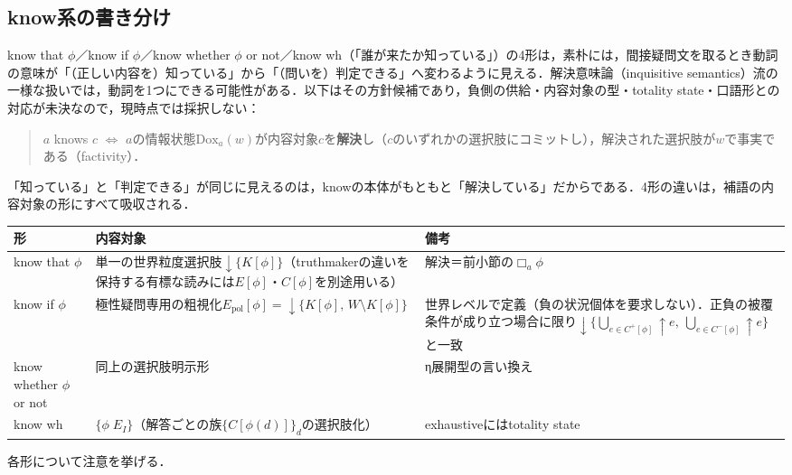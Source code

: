 \documentclass[../../main-detail.tex]{subfiles}
\begin{document}
\subsection{know系の書き分け}\label{subsec:know-forms}
know that $\phi$／know if $\phi$／know whether $\phi$ or not／know wh（「誰が来たか知っている」）の4形は，素朴には，間接疑問文を取るとき動詞の意味が「（正しい内容を）知っている」から「（問いを）判定できる」へ変わるように見える．解決意味論（inquisitive semantics）流の一様な扱いでは，動詞を1つにできる可能性がある．以下はその方針候補であり，負側の供給・内容対象の型・totality state・口語形との対応が未決なので，現時点では採択しない：
\begin{quote}
    $a$ knows $c$ $\iff$ $a$の情報状態$\mathrm{Dox}_a(w)$が内容対象$c$を\textbf{解決}し（$c$のいずれかの選択肢にコミットし），解決された選択肢が$w$で事実である（factivity）．
\end{quote}
「知っている」と「判定できる」が同じに見えるのは，knowの本体がもともと「解決している」だからである．4形の違いは，補語の内容対象の形にすべて吸収される．
\begin{center}
\begin{tabular}{p{40mm}p{40mm}p{32mm}}
    \toprule
    形 & 内容対象 & 備考\\
    \midrule
    know that $\phi$ & 単一の世界粒度選択肢${\downarrow}\{K[\phi]\}$（truthmakerの違いを保持する有標な読みには$E[\phi]$・$C[\phi]$を別途用いる） & 解決＝前小節の$\Box_a\phi$\\
    know if $\phi$ & 極性疑問専用の粗視化$E_{\mathrm{pol}}[\phi] = {\downarrow}\{K[\phi],\,W\setminus K[\phi]\}$ & 世界レベルで定義（負の状況個体を要求しない）．正負の被覆条件が成り立つ場合に限り${\downarrow}\{\bigcup_{e\in C^+[\phi]}{\uparrow}e,\ \bigcup_{e\in C^-[\phi]}{\uparrow}e\}$と一致\\
    know whether $\phi$ or not & 同上の選択肢明示形 & η展開型の言い換え\\
    know wh & $\{\phi\; E_I\}$（解答ごとの族$\{C[\phi(d)]\}_{d}$の選択肢化） & exhaustiveにはtotality state\\
    \bottomrule
\end{tabular}
\end{center}
各形について注意を挙げる．
\end{document}
